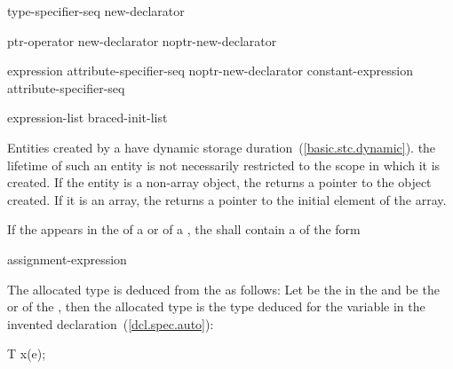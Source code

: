\begin{bnf}
\br
    type-specifier-seq new-declarator\opt
\end{bnf}

\begin{bnf}
\br
    ptr-operator new-declarator\opt \br
    noptr-new-declarator
\end{bnf}

\begin{bnf}
\br
    \terminal{[} expression \terminal{]} attribute-specifier-seq\opt\br
    noptr-new-declarator \terminal{[} constant-expression \terminal{]} attribute-specifier-seq\opt
\end{bnf}

\begin{bnf}
\br
    \terminal{(} expression-list\opt \terminal{)}\br
    braced-init-list
\end{bnf}

%
Entities created by a  have dynamic storage
duration~(\ref{basic.stc.dynamic}).
\enternote 
{}%
the lifetime of such an entity is not necessarily restricted to the
scope in which it is created.
\exitnote 
If the entity is a non-array object, the 
returns a pointer to the object created. If it is an array, the
 returns a pointer to the initial element of
the array.

\pnum
If the   appears in the
 of a  or
 of a ,
the  shall contain a
 of the form

\begin{ncsimplebnf}
\terminal{(} assignment-expression \terminal{)}
\end{ncsimplebnf}

The allocated type is deduced from the  as
follows: Let  be the  in the  and
 be the  or  of
the , then the allocated type is the type
deduced for the variable  in the invented
declaration~(\ref{dcl.spec.auto}):

\begin{codeblock}
T x(e);
\end{codeblock}

